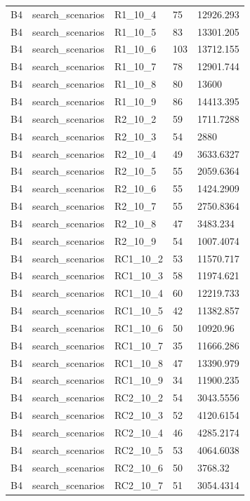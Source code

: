 \begin{longtable}{lllll}
B4 & search\_scenarios & R1\_10\_4 & 75 & 12926.293 \\
B4 & search\_scenarios & R1\_10\_5 & 83 & 13301.205 \\
B4 & search\_scenarios & R1\_10\_6 & 103 & 13712.155 \\
B4 & search\_scenarios & R1\_10\_7 & 78 & 12901.744 \\
B4 & search\_scenarios & R1\_10\_8 & 80 & 13600 \\
B4 & search\_scenarios & R1\_10\_9 & 86 & 14413.395 \\
B4 & search\_scenarios & R2\_10\_2 & 59 & 1711.7288 \\
B4 & search\_scenarios & R2\_10\_3 & 54 & 2880 \\
B4 & search\_scenarios & R2\_10\_4 & 49 & 3633.6327 \\
B4 & search\_scenarios & R2\_10\_5 & 55 & 2059.6364 \\
B4 & search\_scenarios & R2\_10\_6 & 55 & 1424.2909 \\
B4 & search\_scenarios & R2\_10\_7 & 55 & 2750.8364 \\
B4 & search\_scenarios & R2\_10\_8 & 47 & 3483.234 \\
B4 & search\_scenarios & R2\_10\_9 & 54 & 1007.4074 \\
B4 & search\_scenarios & RC1\_10\_2 & 53 & 11570.717 \\
B4 & search\_scenarios & RC1\_10\_3 & 58 & 11974.621 \\
B4 & search\_scenarios & RC1\_10\_4 & 60 & 12219.733 \\
B4 & search\_scenarios & RC1\_10\_5 & 42 & 11382.857 \\
B4 & search\_scenarios & RC1\_10\_6 & 50 & 10920.96 \\
B4 & search\_scenarios & RC1\_10\_7 & 35 & 11666.286 \\
B4 & search\_scenarios & RC1\_10\_8 & 47 & 13390.979 \\
B4 & search\_scenarios & RC1\_10\_9 & 34 & 11900.235 \\
B4 & search\_scenarios & RC2\_10\_2 & 54 & 3043.5556 \\
B4 & search\_scenarios & RC2\_10\_3 & 52 & 4120.6154 \\
B4 & search\_scenarios & RC2\_10\_4 & 46 & 4285.2174 \\
B4 & search\_scenarios & RC2\_10\_5 & 53 & 4064.6038 \\
B4 & search\_scenarios & RC2\_10\_6 & 50 & 3768.32 \\
B4 & search\_scenarios & RC2\_10\_7 & 51 & 3054.4314 \\

\end{longtable}
